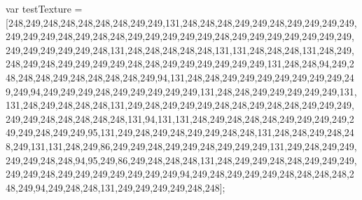 var testTexture = [248,249,248,248,248,248,248,249,249,131,248,248,248,249,249,248,249,249,249,249,249,249,249,248,249,248,248,249,249,249,249,249,248,249,249,249,249,249,249,249,249,249,249,249,249,248,131,248,248,248,248,248,131,131,248,248,248,131,248,249,248,249,248,249,249,249,249,248,248,249,249,249,249,249,249,131,248,248,94,249,248,248,248,249,248,248,248,248,249,94,131,248,248,249,249,249,249,249,249,249,249,249,94,249,249,249,248,249,249,249,249,249,131,248,248,249,249,249,249,249,131,131,248,249,248,248,248,131,249,248,249,249,249,248,248,249,248,248,249,249,249,249,249,248,248,248,248,248,131,94,131,131,248,249,248,248,248,249,249,249,249,249,249,248,249,249,95,131,249,248,249,248,249,249,248,248,131,248,248,249,248,248,249,131,131,248,249,86,249,249,248,249,249,248,249,249,249,131,249,248,249,249,249,249,248,248,94,95,249,86,249,248,248,248,131,248,249,249,248,248,249,249,249,249,249,248,249,249,249,249,249,249,249,94,249,248,249,249,249,248,248,248,248,248,249,94,249,248,248,131,249,249,249,249,248,248];

